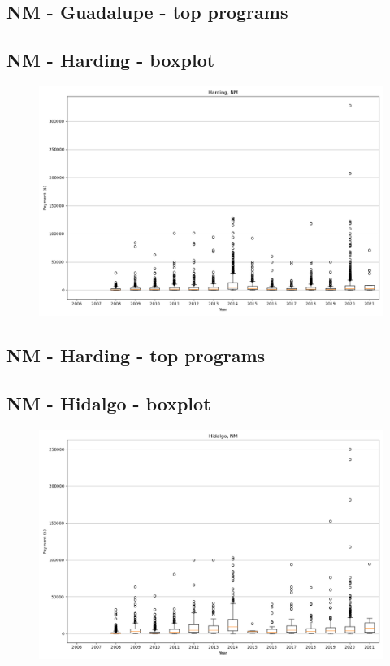 \subsection*{NM - Guadalupe - top programs}

\newpage
\subsection*{NM - Harding - boxplot}
\begin{figure}[h]
\centering
\includegraphics[width=7in]{../output/boxplots/counties/Harding-NM_boxplot.png}
\end{figure}


\subsection*{NM - Harding - top programs}

\newpage
\subsection*{NM - Hidalgo - boxplot}
\begin{figure}[h]
\centering
\includegraphics[width=7in]{../output/boxplots/counties/Hidalgo-NM_boxplot.png}
\end{figure}



